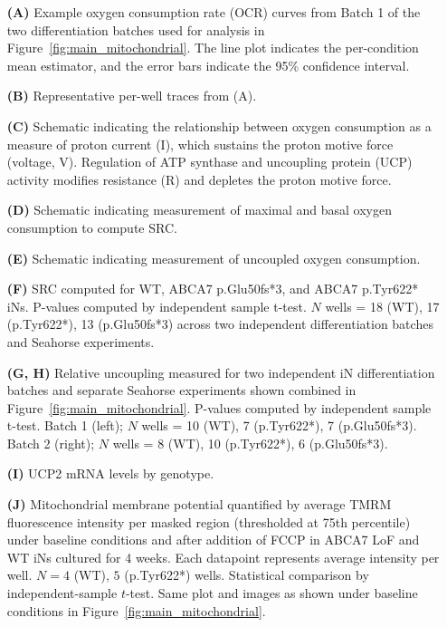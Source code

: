  \begin{itemize}
    \item[\textbf{(A)}] Example oxygen consumption rate (OCR) curves from Batch 1 of the two differentiation batches used for analysis in Figure~\ref{fig:main_mitochondrial}. The line plot indicates the per-condition mean estimator, and the error bars indicate the 95\% confidence interval. 
    \item[\textbf{(B)}] Representative per-well traces from (A). 
    \item[\textbf{(C)}] Schematic indicating the relationship between oxygen consumption as a measure of proton current (I), which sustains the proton motive force (voltage, V). Regulation of ATP synthase and uncoupling protein (UCP) activity modifies resistance (R) and depletes the proton motive force.
    \item[\textbf{(D)}] Schematic indicating measurement of maximal and basal oxygen consumption to compute SRC.
    \item[\textbf{(E)}] Schematic indicating measurement of uncoupled oxygen consumption.
    \item[\textbf{(F)}] SRC computed for WT, ABCA7 p.Glu50fs*3, and ABCA7 p.Tyr622* iNs. P-values computed by independent sample t-test. $N$ wells = 18 (WT), 17 (p.Tyr622*), 13 (p.Glu50fs*3) across two independent differentiation batches and Seahorse experiments. 
    \item[\textbf{(G, H)}] Relative uncoupling measured for two independent iN differentiation batches and separate Seahorse experiments shown combined in Figure~\ref{fig:main_mitochondrial}. P-values computed by independent sample t-test. Batch 1 (left); $N$ wells = 10 (WT), 7 (p.Tyr622*), 7 (p.Glu50fs*3). Batch 2 (right); $N$ wells = 8 (WT), 10 (p.Tyr622*), 6 (p.Glu50fs*3).
    \item[\textbf{(I)}] UCP2 mRNA levels by genotype. 
    \item[\textbf{(J)}] Mitochondrial membrane potential quantified by average TMRM fluorescence intensity per masked region (thresholded at 75th percentile) under baseline conditions and after addition of FCCP in ABCA7 LoF and WT iNs cultured for 4 weeks. Each datapoint represents average intensity per well. $N=4$ (WT), $5$ (p.Tyr622*) wells. Statistical comparison by independent-sample $t$-test. Same plot and images as shown under baseline conditions in Figure~\ref{fig:main_mitochondrial}.
 \end{itemize}